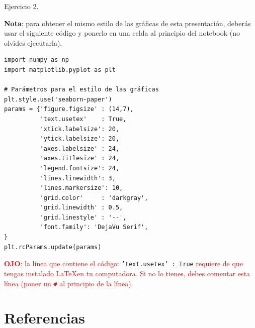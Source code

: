 \documentclass{beamer}
\begin{document}
\begin{frame}[fragile]
	
{\small 
\begin{exampleblock}{Ejercicio 2.}

\textbf{Nota}: para obtener el mismo estilo de las gráficas de esta presentación, 
deberás usar el siguiente código y ponerlo en una celda al principio del notebook (no olvides ejecutarla).

\begin{lstlisting}
import numpy as np
import matplotlib.pyplot as plt

# Parámetros para el estilo de las gráficas
plt.style.use('seaborn-paper')
params = {'figure.figsize' : (14,7),
          'text.usetex'    : True,
          'xtick.labelsize': 20,
          'ytick.labelsize': 20,
          'axes.labelsize' : 24,
          'axes.titlesize' : 24,
          'legend.fontsize': 24,
          'lines.linewidth': 3,
          'lines.markersize': 10,
          'grid.color'     : 'darkgray',
          'grid.linewidth' : 0.5,
          'grid.linestyle' : '--',
          'font.family': 'DejaVu Serif',
}
plt.rcParams.update(params)
\end{lstlisting}
{\tiny \textcolor{red}{\textbf{OJO}: la línea que contiene el código:} \texttt{'text.usetex' : True} 
 \textcolor{red}{requiere de que tengas instalado \LaTeX en tu computadora. Si no lo tienes, debes comentar esta línea (poner un \texttt{\#} 
 al principio de la línea).}}
\end{exampleblock}
}
\end{frame}

\section<presentation>{Referencias}
\end{document}
